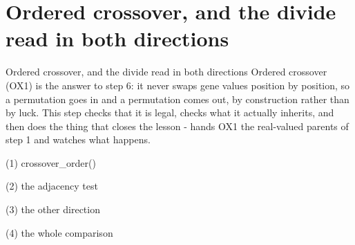 
\section{Ordered crossover, and the divide read in both directions}

\begin{frame}{Ordered crossover, and the divide read in both directions}
Ordered crossover (OX1) is the answer to step 6: it never swaps gene values
position by position, so a permutation goes in and a permutation comes out, by
construction rather than by luck. This step checks that it is legal, checks what
it actually inherits, and then does the thing that closes the lesson - hands OX1
the real-valued parents of step 1 and watches what happens.
\end{frame}

\begin{frame}[fragile]{(1) crossover\_order()}

\end{frame}

\begin{frame}[fragile]{(2) the adjacency test}

\end{frame}

\begin{frame}[fragile]{(3) the other direction}

\end{frame}

\begin{frame}[fragile]{(4) the whole comparison}

\end{frame}

